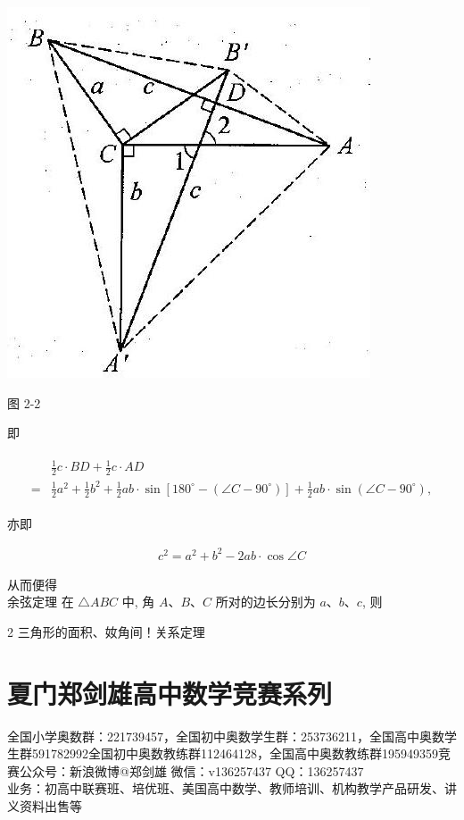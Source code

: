 \documentclass[10pt]{article}
\begin{document}
\begin{center}
\includegraphics[max width=\textwidth]{2024_10_30_2c8f45efd4a519b08e1ag-015}
\end{center}

图 2-2

即

\begin{align*}
\begin{aligned}
& \frac{1}{2} c \cdot B D+\frac{1}{2} c \cdot A D \\
= & \frac{1}{2} a^{2}+\frac{1}{2} b^{2}+\frac{1}{2} a b \cdot \sin \left[180^{\circ}-\left(\angle C-90^{\circ}\right)\right]+\frac{1}{2} a b \cdot \sin \left(\angle C-90^{\circ}\right),
\end{aligned}
\end{align*}

亦即

\begin{align*}
c^{2}=a^{2}+b^{2}-2 a b \cdot \cos \angle C
\end{align*}

从而便得\\
余弦定理 在 $\triangle A B C$ 中, 角 $A 、 B 、 C$ 所对的边长分别为 $a 、 b 、 c$, 则

2 三角形的面积、奻角间！关系定理

\section*{夏门郑剑雄高中数学竞赛系列}
全国小学奥数群：221739457，全国初中奥数学生群：253736211，全国高中奥数学生群591782992全国初中奥数教练群112464128，全国高中奥数教练群195949359竞赛公众号：新浪微博@郑剑雄 微信：v136257437 QQ：136257437\\
业务：初高中联赛班、培优班、美国高中数学、教师培训、机构教学产品研发、讲义资料出售等
\end{document}
